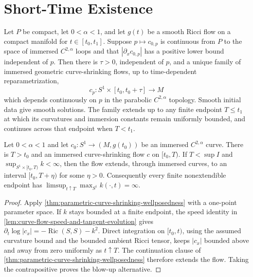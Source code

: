 \section{Short-Time Existence}

\begin{theorem}
\label{thm:parametric-curve-shrinking-wellposedness}
\notready
Let $P$ be compact, let $0<\alpha<1$, and let $g(t)$ be a smooth Ricci
flow on a compact manifold for $t\in[t_0,t_1]$.  Suppose
$p\mapsto c_{0,p}$ is continuous from $P$ to the space of immersed
$C^{2,\alpha}$ loops and that $|\partial_xc_{0,p}|$ has a positive lower
bound independent of $p$.  Then there is $\tau>0$, independent of $p$, and
a unique family of immersed geometric curve-shrinking flows, up to
time-dependent reparametrization,
\[
 c_p\colon S^1\times[t_0,t_0+\tau]\longrightarrow M
\]
which depends continuously on $p$ in the parabolic
$C^{2,\alpha}$ topology.  Smooth initial data give smooth solutions.  The
family extends up to any finite endpoint $T\le t_1$ at which its curvatures
and immersion constants remain uniformly bounded, and continues across that
endpoint when $T<t_1$.
\end{theorem}

\begin{theorem}
\label{thm:curve-shrinking-short-time-existence}
\notready
Let $0<\alpha<1$ and let
$c_0\colon S^1\to(M,g(t_0))$ be an immersed $C^{2,\alpha}$ curve.  There is
$T>t_0$ and an immersed curve-shrinking flow $c$ on $[t_0,T)$.  If
$T<\sup I$
and $\sup_{S^1\times[t_0,T)}k<\infty$, then the flow extends, through
immersed curves, to an interval $[t_0,T+\eta)$ for some $\eta>0$.
Consequently every finite nonextendible endpoint has
$\limsup_{t\uparrow T}\max_{S^1}k(\cdot,t)=\infty$.
\end{theorem}
\begin{proof}
Apply \ref{thm:parametric-curve-shrinking-wellposedness} with a one-point
parameter space.  If $k$ stays bounded at a finite endpoint, the speed
identity in \ref{lem:curve-flow-speed-and-tangent-evolution} gives
$\partial_t\log|c_x|=-\operatorname{Ric}(S,S)-k^2$.  Direct integration on
$[t_0,t)$, using the assumed curvature bound and the bounded ambient Ricci
tensor, keeps $|c_x|$ bounded above and away from zero uniformly as
$t\uparrow T$.
The continuation clause of
\ref{thm:parametric-curve-shrinking-wellposedness} therefore extends the flow.
Taking the contrapositive proves the blow-up alternative.
\end{proof}


